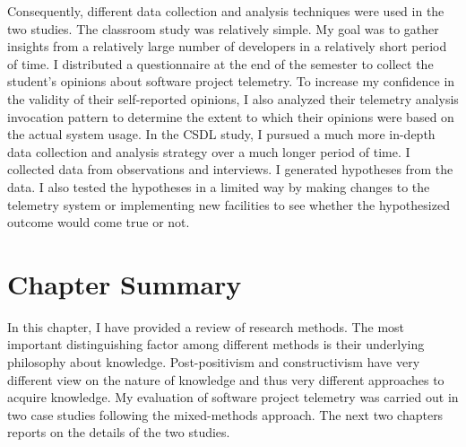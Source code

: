 Consequently, different data collection and analysis techniques were used in the two studies. 
The classroom study was relatively simple. My goal was to gather insights from a relatively large number of developers in a relatively short period of time. I distributed a questionnaire at the end of the semester to collect the student's opinions about software project telemetry. To increase my confidence in the validity of their self-reported opinions, I also analyzed their telemetry analysis invocation pattern to determine the extent to which their opinions were based on the actual system usage. 
In the CSDL study, I pursued a much more in-depth data collection and analysis strategy over a much longer period of time. I collected data from observations and interviews. I generated hypotheses from the data. I also tested the hypotheses in a limited way by making changes to the telemetry system or implementing new facilities to see whether the hypothesized outcome would come true or not. 







\section{Chapter Summary} \label{EvaluationStrategy:Summary}

In this chapter, I have provided a review of research methods. The most important distinguishing factor among different methods is their underlying philosophy about knowledge. Post-positivism and constructivism have very different view on the nature of knowledge and thus very different approaches to acquire knowledge. 
My evaluation of software project telemetry was carried out in two case studies following the mixed-methods approach. The next two chapters reports on the details of the two studies.